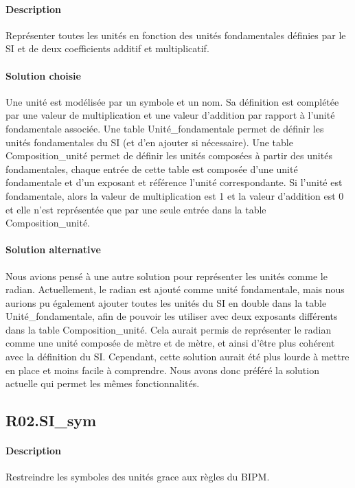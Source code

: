 \documentclass{article}
\begin{document}
\paragraph{Description} Représenter toutes les unités en fonction des unités fondamentales définies par le SI
et de deux coefficients additif et multiplicatif.

\paragraph{Solution choisie}
Une unité est modélisée par un symbole et un nom. Sa définition est complétée par une valeur de multiplication et une valeur d'addition par rapport à l'unité fondamentale associée.
Une table Unité\_fondamentale permet de définir les unités fondamentales du SI (et d'en ajouter si nécessaire).
Une table Composition\_unité permet de définir les unités composées à partir des unités fondamentales, chaque entrée de cette table est composée d'une unité fondamentale et d'un exposant
et référence l'unité correspondante.
Si l'unité est fondamentale, alors la valeur de multiplication est 1 et la valeur d'addition est 0 et elle n'est représentée que par une seule entrée dans la table Composition\_unité.

\paragraph{Solution alternative}
Nous avions pensé à une autre solution pour représenter les unités comme le radian.
Actuellement, le radian est ajouté comme unité fondamentale,
mais nous aurions pu également ajouter toutes les unités du SI en double dans la table
Unité\_fondamentale, afin de pouvoir les utiliser avec deux exposants différents
dans la table Composition\_unité. Cela aurait permis de représenter le radian
comme une unité composée de mètre et de mètre, et ainsi d'être plus cohérent avec
la définition du SI. Cependant, cette solution aurait été plus lourde à mettre en
place et moins facile à comprendre. Nous avons donc préféré la solution actuelle qui
permet les mêmes fonctionnalités.

\subsection{R02.SI\_sym}
\paragraph{Description} Restreindre les symboles des unités grace aux règles du BIPM.
\end{document}

